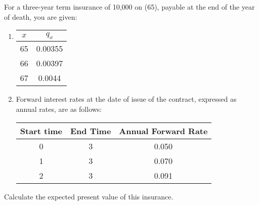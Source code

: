 For a three-year term insurance of 10,000 on (65), payable at the end of the year of death, you are given:
\begin{enumerate}
\item \begin{tabular}[t]{|c|c|} \hline $x$ & $q_x$ \\ \hline 65 & 0.00355 \\ 66 & 0.00397 \\ 67 & 0.0044 \\ \hline \end{tabular}
\item Forward interest rates at the date of issue of the contract, expressed as annual rates, are as follows:
\begin{center}\begin{tabular}{ccc} Start time & End Time & Annual Forward Rate \\ \hline
                                        0 & 3 & 0.050 \\
                                        1 &  3 & 0.070 \\
                                        2 & 3 & 0.091   \end{tabular}\end{center}
\end{enumerate}
Calculate the expected present value of this insurance.

